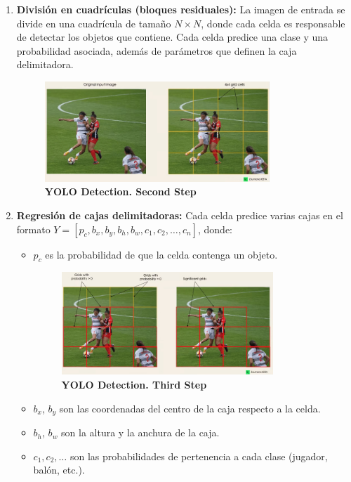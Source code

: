 \documentclass[12pt, a4paper, twoside]{article}
\begin{document}
	\begin{enumerate}
		\item \textbf{División en cuadrículas (bloques residuales):} La imagen de entrada se divide en una cuadrícula de tamaño $N\times N$, donde cada celda es responsable de detectar los objetos que contiene. Cada celda predice una clase y una probabilidad asociada, además de parámetros que definen la caja delimitadora. 
		
		\begin{figure}[H]
			\centering
			\includegraphics[width=0.8\textwidth]{image/yolodec2}
			\caption{\textbf{YOLO Detection. Second Step}}
			\label{fig:YOLO Detection. Second Step}
		\end{figure}
		
		
		\item \textbf{Regresión de cajas delimitadoras:} Cada celda predice varias cajas en el formato $Y = [p_c, b_x, b_y, b_h, b_w, c_1, c_2, \dots, c_n]$, donde:
		\begin{itemize}
			\item $p_c$ es la probabilidad de que la celda contenga un objeto.
			\begin{figure}[H]
				\centering
				\includegraphics[width=0.8\textwidth]{image/yolodec3}
				\caption{\textbf{YOLO Detection. Third Step}}
				\label{fig:YOLO Detection. Third Step}
			\end{figure}
			\item $b_x$, $b_y$ son las coordenadas del centro de la caja respecto a la celda.
			\item $b_h$, $b_w$ son la altura y la anchura de la caja.
			\item $c_1, c_2, \dots$ son las probabilidades de pertenencia a cada clase (jugador, balón, etc.).
		\end{itemize}
		

\end{enumerate}
\end{document}
